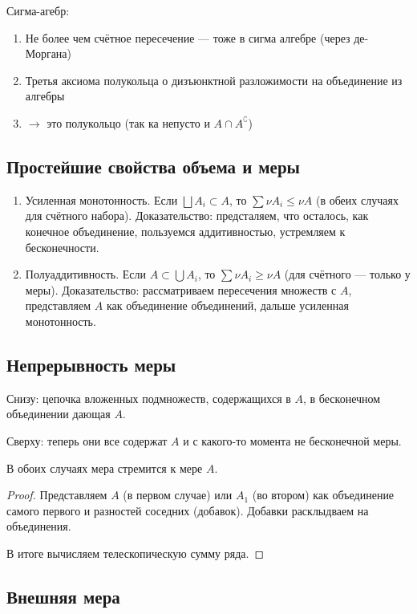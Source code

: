 \documentclass[12pt, a4paper, oneside]{memoir}
\begin{document}
Сигма-агебр:
\begin{enumerate}
    \item Не более чем счётное пересечение — тоже в сигма алгебре (через де-Моргана)
    \item Третья аксиома полукольца о дизъюнктной разложимости на объединение из алгебры
    \item $→$ это полукольцо (так ка непусто и $A \cap A^{\complement}$)
\end{enumerate}

\subsection{Простейшие свойства объема и меры}

\begin{enumerate}
    \item Усиленная монотонность. Если $\bigsqcup A_i \subset A$, то $\sum \nu A_i \leqslant \nu A$ (в обеих случаях для счётного набора). Доказательство: предсталяем, что осталось, как конечное объединение, пользуемся аддитивностью, устремляем к бесконечности.
    \item Полуаддитивность. Если $A \subset \bigcup A_i$, то $\sum \nu A_i \geqslant \nu A$ (для счётного — только у меры). Доказательство: рассматриваем пересечения множеств с $A$, представляем $A$ как объединение объединений, дальше усиленная монотонность.
\end{enumerate}

\subsection{Непрерывность меры}

Снизу: цепочка вложенных подмножеств, содержащихся в $A$, в бесконечном объединении дающая $A$.

Сверху: теперь они все содержат $A$ и с какого-то момента не бесконечной меры.

В обоих случаях мера стремится к мере $A$.

\begin{proof}
    Представляем $A$ (в первом случае) или $A_1$ (во втором) как объединение самого первого и разностей соседних (добавок).
    Добавки расклыдваем на объединения.

    В итоге вычисляем телескопическую сумму ряда.
\end{proof}


\subsection{Внешняя мера}
\end{document}
